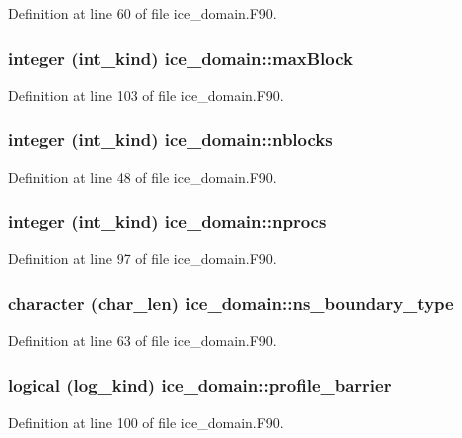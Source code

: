 Definition at line 60 of file ice\_\-domain.F90.\hypertarget{namespaceice__domain_ae245e03a7c30b2d04cbd99256514fe65}{
\subsubsection[{maxBlock}]{\setlength{\rightskip}{0pt plus 5cm}integer (int\_\-kind) {\bf ice\_\-domain::maxBlock}}}
\label{namespaceice__domain_ae245e03a7c30b2d04cbd99256514fe65}


Definition at line 103 of file ice\_\-domain.F90.\hypertarget{namespaceice__domain_aae3d2de717ee7a743c9635b3a9e35a95}{
\subsubsection[{nblocks}]{\setlength{\rightskip}{0pt plus 5cm}integer (int\_\-kind) {\bf ice\_\-domain::nblocks}}}
\label{namespaceice__domain_aae3d2de717ee7a743c9635b3a9e35a95}


Definition at line 48 of file ice\_\-domain.F90.\hypertarget{namespaceice__domain_afcc67a62427b0b7620d366168d6a42ff}{
\subsubsection[{nprocs}]{\setlength{\rightskip}{0pt plus 5cm}integer (int\_\-kind) {\bf ice\_\-domain::nprocs}}}
\label{namespaceice__domain_afcc67a62427b0b7620d366168d6a42ff}


Definition at line 97 of file ice\_\-domain.F90.\hypertarget{namespaceice__domain_a50e350eed39ec93fdfef517e4b45b5a5}{
\subsubsection[{ns\_\-boundary\_\-type}]{\setlength{\rightskip}{0pt plus 5cm}character (char\_\-len) {\bf ice\_\-domain::ns\_\-boundary\_\-type}}}
\label{namespaceice__domain_a50e350eed39ec93fdfef517e4b45b5a5}


Definition at line 63 of file ice\_\-domain.F90.\hypertarget{namespaceice__domain_a8f4a0f7b5e1a37ba6e8e8e64dd040267}{
\subsubsection[{profile\_\-barrier}]{\setlength{\rightskip}{0pt plus 5cm}logical (log\_\-kind) {\bf ice\_\-domain::profile\_\-barrier}}}
\label{namespaceice__domain_a8f4a0f7b5e1a37ba6e8e8e64dd040267}


Definition at line 100 of file ice\_\-domain.F90.